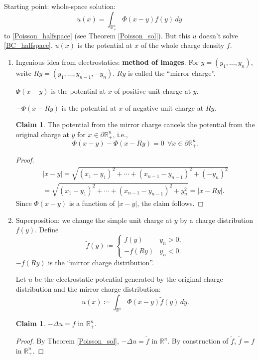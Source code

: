 \documentclass[12pt]{article}
\theoremstyle{definition}
\newtheorem*{claim*}{Claim}
\newtheorem{claim}{Claim}
\begin{document}
Starting point: whole-space solution:
\[u(x)=\int_{\mathbb{R}_+^n}\Phi(x-y)f(y)\,dy\]
to \eqref{Poisson_halfspace} (see Theorem \ref{Poisson_sol}). But this $u$ doesn't solve \eqref{BC_halfspace}. $u(x)$ is the potential at $x$ of the whole charge density $f$.

\begin{enumerate}[label=\arabic*.]
\item\label{method_images} Ingenious idea from electrostatics: \textbf{method of images}. For $y=(y_1,\ldots,y_n)$, write $Ry=(y_1,\ldots,y_{n-1},-y_n)$. $Ry$ is called the ``mirror charge''.

$\Phi(x-y)$ is the potential at $x$ of positive unit charge at $y$.

$-\Phi(x-Ry)$ is the potential at $x$ of negative unit charge at $Ry$.

\begin{claim*}
The potential from the mirror charge cancels the potential from the original charge at $y$ for $x\in\partial\mathbb{R}_+^n$, i.e.,
\[\Phi(x-y)-\Phi(x-Ry)=0\ \ \forall x\in\partial\mathbb{R}_+^n.\]
\end{claim*}

\begin{proof}
\begin{multline*}
|x-y|=\sqrt{(x_1-y_1)^2+\cdots+(x_{n-1}-y_{n-1})^2+(-y_n)^2}\\
=\sqrt{(x_1-y_1)^2+\cdots+(x_{n-1}-y_{n-1})^2+y_n^2}=|x-Ry|.
\end{multline*}
Since $\Phi(x-y)$ is a function of $|x-y|$, the claim follows.
\end{proof}

\item Superposition: we change the simple unit charge at $y$ by a charge distribution $f(y)$. Define
\[\tilde{f}(y)\coloneqq\left\{\begin{array}{cc}f(y)&y_n>0,\\-f(Ry)&y_n<0.\end{array}\right.\]
$-f(Ry)$ is the ``mirror charge distribution''.

Let $u$ be the electrostatic potential generated by the original charge distribution and the mirror charge distribution:
\[u(x)\coloneqq\int_{\mathbb{R}^n}\Phi(x-y)\tilde{f}(y)\,dy.\]

\setcounter{claim}{0}
\begin{claim}
$-\Delta u=f$ in $\mathbb{R}_+^n$.
\end{claim}

\begin{proof}
By Theorem \ref{Poisson_sol}, $-\Delta u=\tilde{f}$ in $\mathbb{R}^n$. By construction of $\tilde{f}$, $\tilde{f}=f$ in $\mathbb{R}_+^n$.
\end{proof}


\end{enumerate}
\end{document}
